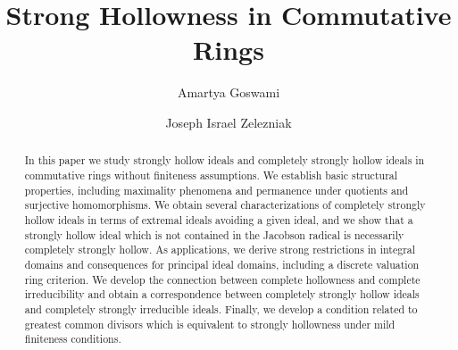 \documentclass[11pt,english]{amsart}
\theoremstyle{definition}
\numberwithin{equation}{section}
\theoremstyle{remark}
\begin{document}
	
\title{Strong Hollowness in Commutative Rings}
	
\author{Amartya Goswami}
\address{[1]  Department of Mathematics and Applied Mathematics, University of Johannesburg, P.O. Box 524, Auckland Park 2006, South Africa. [2]  National Institute for Theoretical and Computational Sciences (NITheCS), South Africa.}

\author{Joseph Israel Zelezniak}

\address{Department of Mathematics and Applied Mathematics, University of Cape Town, Rondebosch 7700, South Africa}
	



	
\begin{abstract}
In this paper we study strongly hollow ideals and completely strongly hollow ideals in commutative rings without finiteness
assumptions. We establish basic structural properties, including maximality phenomena and permanence under quotients and
surjective homomorphisms. We obtain several characterizations of completely strongly hollow ideals in terms of extremal ideals
avoiding a given ideal, and we show that a strongly hollow ideal which is not contained in the Jacobson radical is necessarily
completely strongly hollow. As applications, we derive strong restrictions in integral domains and consequences for principal
ideal domains, including a discrete valuation ring criterion. We develop the connection between complete hollowness and
complete irreducibility and obtain a correspondence between completely strongly hollow ideals and completely strongly irreducible
ideals. Finally, we develop a condition related to greatest common divisors which is equivalent to strongly hollowness under mild finiteness conditions.
\end{abstract}

	
\maketitle 
\end{document}
